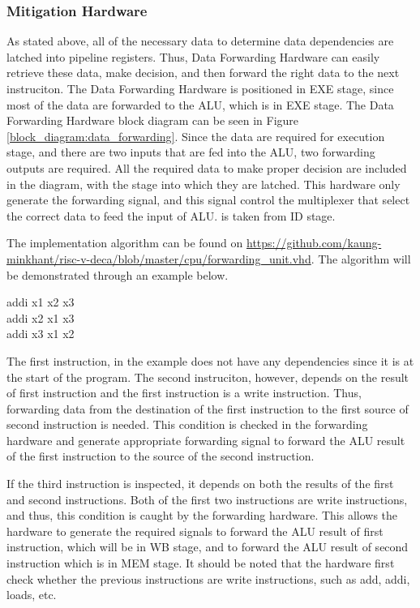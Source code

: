 \subsubsection{Mitigation Hardware}
As stated above, all of the necessary data to determine data dependencies are latched into pipeline registers.
Thus, Data Forwarding Hardware can easily retrieve these data, make decision, and then forward the right data to the next instruciton.
The Data Forwarding Hardware is positioned in EXE stage, since most of the data are forwarded to the ALU, which is in EXE stage.
The Data Forwarding Hardware block diagram can be seen in Figure \ref{block_diagram:data_forwarding}.
Since the data are required for execution stage, and there are two inputs that are fed into the ALU, two forwarding outputs are required.
All the required data to make proper decision are included in the diagram, with the stage into which they are latched.
This hardware only generate the forwarding signal, and this signal control the multiplexer that select the correct data to feed the input of ALU.
 is taken from ID stage.

\newpage
The implementation algorithm can be found on \url{https://github.com/kaung-minkhant/risc-v-deca/blob/master/cpu/forwarding_unit.vhd}.
The algorithm will be demonstrated through an example below.
\begin{center}
    addi x1 x2 x3\\
    addi x2 x1 x3\\
    addi x3 x1 x2
\end{center}

The first instruction, in the example does not have any dependencies since it is at the start of the program.
The second instruciton, however, depends on the result of first instruction and the first instruction is a write instruction.
Thus, forwarding data from the destination of the first instruction to the first source of second instruction is needed.
This condition is checked in the forwarding hardware and generate appropriate forwarding signal to forward the ALU result of the first instruction to the source of the second instruction.

If the third instruction is inspected, it depends on both the results of the first and second instructions.
Both of the first two instructions are write instructions, and thus, this condition is caught by the forwarding hardware.
This allows the hardware to generate the required signals to forward the ALU result of first instruction, which will be in WB stage, and to forward the ALU result of second instruction
which is in MEM stage. It should be noted that the hardware first check whether the previous instructions are write instructions, such as add, addi, loads, etc.

